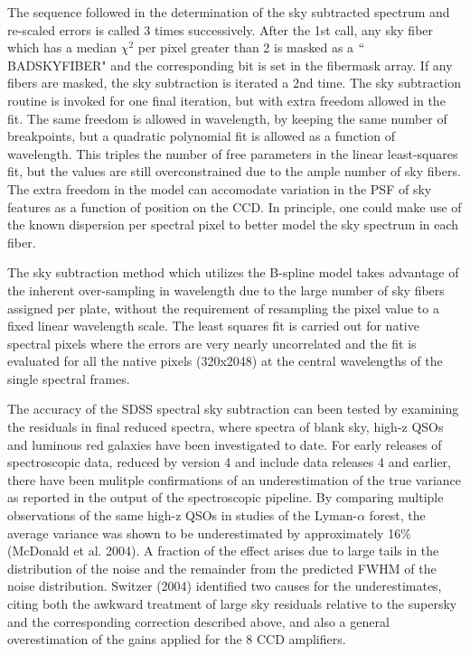 \documentclass[12pt,preprint]{aastex}
\begin{document}
The sequence followed in the determination of the sky subtracted spectrum
and re-scaled errors is called 3 times successively.  After the 1st call,
any sky fiber which has a median $\chi^2$ per pixel greater than 2 is 
masked as a $``$BADSKYFIBER" and the corresponding bit is set in the fibermask
array.  If any fibers are masked, the sky subtraction is iterated a 2nd time.
The sky subtraction routine is invoked for one final iteration, but with extra 
freedom allowed in the fit.  The same freedom is allowed in wavelength, by
keeping the same number of breakpoints, but a quadratic polynomial fit is
allowed as a function of wavelength.  This triples the number of free 
parameters in the linear least-squares fit, but the values are still 
overconstrained due to the ample number of sky fibers.  The extra freedom
in the model can accomodate variation in the PSF of sky features as a function 
of position on the CCD.  In principle, one could make use of the known 
dispersion per spectral pixel to better model the sky spectrum
in each fiber.

The sky subtraction method which utilizes the B-spline model takes advantage 
of the inherent over-sampling in wavelength due to the large number of 
sky fibers assigned per plate, without the requirement of resampling the 
pixel value to a fixed linear wavelength scale.  The least squares fit
is carried out for native spectral pixels where the errors are very nearly 
uncorrelated and the fit is evaluated for all the native pixels (320x2048)  
at the central wavelengths of the single spectral frames.
    
The accuracy of the SDSS spectral sky subtraction can been tested by examining
the residuals in final reduced spectra, where spectra of blank sky, high-z QSOs
and luminous red galaxies have been investigated to date.
For early releases of spectroscopic data, reduced by version 4 and include
data releases 4 and earlier, there have been mulitple confirmations of an
underestimation of the true variance as reported in the output of the 
spectroscopic pipeline.  By comparing multiple observations of the same
high-z QSOs in studies of the Lyman-$\alpha$ forest, the average variance was
shown to be underestimated by approximately 16\% (McDonald et al. 2004).  
A fraction of the effect arises due to large tails in the distribution 
of the noise and the remainder from the predicted FWHM of the noise 
distribution.  Switzer (2004) identified two causes for the underestimates,
citing both the awkward treatment of large sky residuals relative to the
supersky and the corresponding correction described above, and also a general
overestimation of the gains applied for the 8 CCD amplifiers. 
\end{document}
